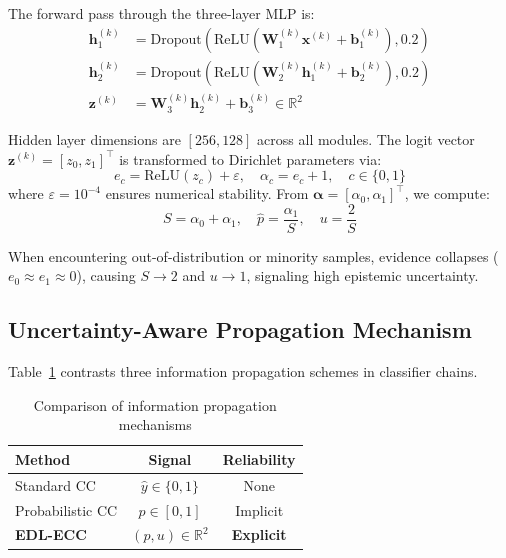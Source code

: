 \documentclass[conference]{IEEEtran}
\begin{document}
The forward pass through the three-layer MLP is:
\begin{align}
    \mathbf{h}_1^{(k)} &= \text{Dropout}(\text{ReLU}(\mathbf{W}_1^{(k)} \mathbf{x}^{(k)} + \mathbf{b}_1^{(k)}), 0.2) \label{eq:h1_new} \\
    \mathbf{h}_2^{(k)} &= \text{Dropout}(\text{ReLU}(\mathbf{W}_2^{(k)} \mathbf{h}_1^{(k)} + \mathbf{b}_2^{(k)}), 0.2) \label{eq:h2_new} \\
    \mathbf{z}^{(k)} &= \mathbf{W}_3^{(k)} \mathbf{h}_2^{(k)} + \mathbf{b}_3^{(k)} \in \mathbb{R}^2 \label{eq:logit_new}
\end{align}

Hidden layer dimensions are $[256, 128]$ across all modules. The logit vector $\mathbf{z}^{(k)} = [z_0, z_1]^\top$ is transformed to Dirichlet parameters via:
\begin{equation}
    e_c = \text{ReLU}(z_c) + \varepsilon, \quad \alpha_c = e_c + 1, \quad c \in \{0, 1\}
    \label{eq:evidence_new}
\end{equation}
where $\varepsilon = 10^{-4}$ ensures numerical stability. From $\boldsymbol{\alpha} = [\alpha_0, \alpha_1]^\top$, we compute:
\begin{equation}
    S = \alpha_0 + \alpha_1, \quad \hat{p} = \frac{\alpha_1}{S}, \quad u = \frac{2}{S}
    \label{eq:pu_computation}
\end{equation}

When encountering out-of-distribution or minority samples, evidence collapses ($e_0 \approx e_1 \approx 0$), causing $S \to 2$ and $u \to 1$, signaling high epistemic uncertainty.

\subsection{Uncertainty-Aware Propagation Mechanism}

Table~\ref{tab:propagation_comparison} contrasts three information propagation schemes in classifier chains.

\begin{table}[t]
\centering
\caption{Comparison of information propagation mechanisms}
\label{tab:propagation_comparison}
\small
\begin{tabular}{lcc}
\toprule
\textbf{Method} & \textbf{Signal} & \textbf{Reliability} \\ 
\midrule
Standard CC & $\hat{y} \in \{0,1\}$ & None \\
Probabilistic CC & $p \in [0,1]$ & Implicit \\
\textbf{EDL-ECC} & $(p, u) \in \mathbb{R}^2$ & \textbf{Explicit} \\ 
\bottomrule
\end{tabular}
\end{table}
\end{document}
